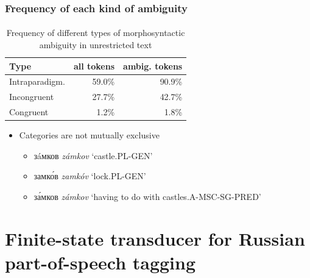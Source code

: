 \documentclass{beamer}
\newcommand{\rus}[1]{\foreignlanguage{russian}{#1}}
\begin{document}
\begin{frame}
\frametitle{Frequency of each kind of ambiguity}
\framesubtitle{}
\begin{table}
  \centering
  \begin{tabular}{l|rr}
    \hline
    \textbf{Type}  & \textbf{all tokens} & \textbf{ambig. tokens} \\
    \hline
    Intraparadigm. & 59.0\%                   & 90.9\%   \\
    Incongruent    & 27.7\%                   & 42.7\%   \\ 
    Congruent      & 1.2\%                   & 1.8\%    \\ 
    \hline
  \end{tabular}
  \caption{Frequency of different types of morphosyntactic ambiguity in unrestricted text}
  \label{table:ambiguity}
\end{table}
\pause
\begin{itemize}
	\item Categories are not mutually exclusive
	\begin{itemize}
		\item \rus{з\'{a}мков} \emph{zámkov} `castle.PL-GEN'
		\item \rus{замк\'{о}в} \emph{zamkóv} `lock.PL-GEN'
		\item \rus{з\'{а}мков} \emph{zámkov} `having to do with castles.A-MSC-SG-PRED'
	\end{itemize}
\end{itemize}
\end{frame}

\section{Finite-state transducer for Russian part-of-speech tagging} %
\end{document}
